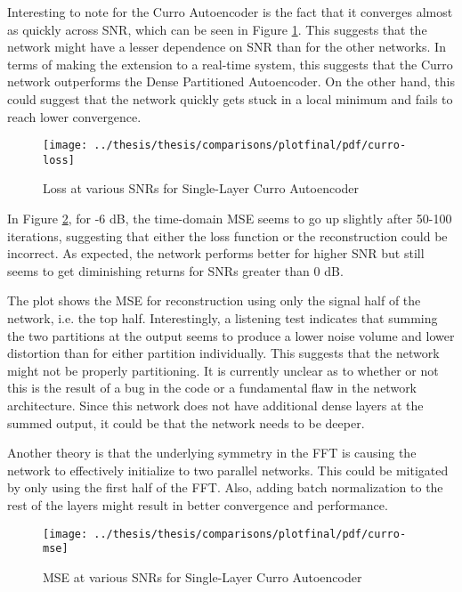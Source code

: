 Interesting to note for the Curro Autoencoder is the fact that it converges almost as quickly across SNR, which can be seen in Figure \ref{fig:curro-loss}. This suggests that the network might have a lesser dependence on SNR than for the other networks. In terms of making the extension to a real-time system, this suggests that the Curro network outperforms the Dense Partitioned Autoencoder. On the other hand, this could suggest that the network quickly gets stuck in a local minimum and fails to reach lower convergence.

\begin{figure}[!ht]
\centering
\texttt{[image: ../thesis/thesis/comparisons/plotfinal/pdf/curro-loss]}
\caption{Loss at various SNRs for Single-Layer Curro Autoencoder}\label{fig:curro-loss}
\end{figure}

In Figure \ref{fig:curro-mse}, for -6 dB, the time-domain MSE seems to go up slightly after 50-100 iterations, suggesting that either the loss function or the reconstruction could be incorrect. As expected, the network performs better for higher SNR but still seems to get diminishing returns for SNRs greater than 0 dB.

The plot shows the MSE for reconstruction using only the signal half of the network, i.e. the top half. Interestingly, a listening test indicates that summing the two partitions at the output seems to produce a lower noise volume and lower distortion than for either partition individually. This suggests that the network might not be properly partitioning. It is currently unclear as to whether or not this is the result of a bug in the code or a fundamental flaw in the network architecture. Since this network does not have additional dense layers at the summed output, it could be that the network needs to be deeper.

Another theory is that the underlying symmetry in the FFT is causing the network to effectively initialize to two parallel networks. This could be mitigated by only using the first half of the FFT. Also, adding batch normalization to the rest of the layers might result in better convergence and performance.

\begin{figure}[!ht]
\centering
\texttt{[image: ../thesis/thesis/comparisons/plotfinal/pdf/curro-mse]}
\caption{MSE at various SNRs for Single-Layer Curro Autoencoder}\label{fig:curro-mse}
\end{figure}

